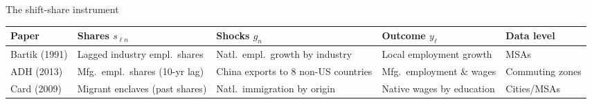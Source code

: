 \documentclass[aspectratio=169, 10pt]{beamer}
\begin{document}
\begin{frame}[shrink=9]{The shift-share instrument}
  \smallskip
  {\scriptsize\renewcommand{\arraystretch}{1.2}%
  \begin{tabularx}{\linewidth}{l>{\raggedright\arraybackslash}X>{\raggedright\arraybackslash}X>{\raggedright\arraybackslash}X>{\raggedright\arraybackslash}X}
    \toprule
    Paper & Shares $s_{\ell n}$ & Shocks $g_n$ & Outcome $y_\ell$ & Data level \\
    \midrule
    Bartik (1991) & Lagged industry empl.\ shares & Natl.\ empl.\ growth by industry & Local employment growth & MSAs \\
    ADH (2013)    & Mfg.\ empl.\ shares (10-yr lag) & China exports to 8 non-US countries & Mfg.\ employment \& wages & Commuting zones \\
    Card (2009)   & Migrant enclaves (past shares) & Natl.\ immigration by origin & Native wages by education & Cities/MSAs \\
    \bottomrule
  \end{tabularx}}

\end{frame}
\end{document}
